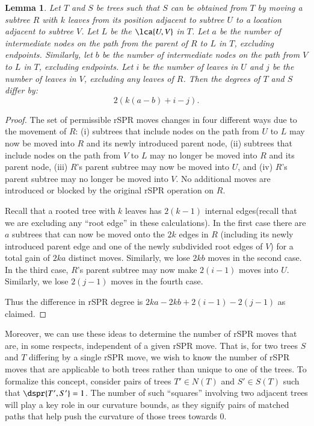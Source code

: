 \documentclass[]{elsarticle}
\newtheorem{lem}[thm]{Lemma}
\begin{document}
\begin{lem}
\label{lem:degree_change}
Let $T$ and $S$ be trees such that $S$ can be obtained from $T$ by moving a subtree $R$ with $k$ leaves from its position adjacent to subtree $U$ to a location adjacent to subtree $V$.
Let $L$ be the $\lca{U,V}$ in $T$.
Let $a$ be the number of intermediate nodes on the path from the parent of $R$ to $L$ in $T$, excluding endpoints.
Similarly, let $b$ be the number of intermediate nodes on the path from $V$ to $L$ in $T$, excluding endpoints.
Let $i$ be the number of leaves in $U$ and $j$ be the number of leaves in $V$, excluding any leaves of $R$.
Then the degrees of $T$ and $S$ differ by:
$$2\left(k(a-b) + i - j\right).$$

\end{lem}
\begin{proof}
The set of permissible rSPR moves changes in four different ways due to the movement of $R$:
(i) subtrees that include nodes on the path from $U$ to $L$ may now be moved into $R$ and its newly introduced parent node,
(ii) subtrees that include nodes on the path from $V$ to $L$ may no longer be moved into $R$ and its parent node,
(iii) $R$'s parent subtree may now be moved into $U$, and
(iv) $R$'s parent subtree may no longer be moved into $V$.
No additional moves are introduced or blocked by the original rSPR operation on $R$.

Recall that a rooted tree with $k$ leaves has $2(k-1)$ internal edges(recall that we are excluding any ``root edge'' in these calculations).
In the first case there are $a$ subtrees that can now be moved onto the $2k$ edges in $R$ (including its newly introduced parent edge and one of the newly subdivided root edges of $V$) for a total gain of $2ka$ distinct moves.
Similarly, we lose $2kb$ moves in the second case.
In the third case, $R$'s parent subtree may now make $2(i-1)$ moves into $U$.
Similarly, we lose $2(j-1)$ moves in the fourth case.

Thus the difference in rSPR degree is $2ka - 2kb + 2(i-1) - 2(j-1)$ as claimed.
\end{proof}


Moreover, we can use these ideas to determine the number of rSPR moves that are, in some respects, independent of a given rSPR move.
That is, for two trees $S$ and $T$ differing by a single rSPR move, we wish to know the number of rSPR moves that are applicable to both trees rather than unique to one of the trees.
To formalize this concept, consider pairs of trees $T' \in N(T)$ and $S' \in S(T)$ such that $\dspr{T',S'} = 1$.
The number of such ``squares'' involving two adjacent trees will play a key role in our curvature bounds, as they signify pairs of matched paths that help push the curvature of those trees towards 0.
\end{document}
